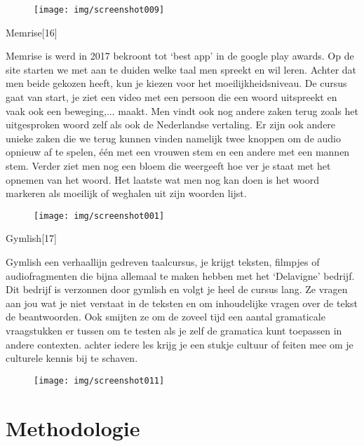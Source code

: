 \documentclass{hogent-article}
\begin{document}
\begin{figure}
    \centering
    \texttt{[image: img/screenshot009]}
    \caption{}
    \label{fig:screenshot009}
\end{figure}

Memrise[16]

Memrise is werd in 2017 bekroont tot ‘best app’ in de google play awards. Op de site starten we met aan te duiden welke taal men spreekt en wil leren. Achter dat men beide gekozen heeft, kun je kiezen voor het moeilijkheidsniveau. De cursus gaat van start, je ziet een video met een persoon die een woord uitspreekt en vaak ook een beweging,... maakt. Men vindt ook nog andere zaken terug zoals het uitgesproken woord zelf als ook de Nederlandse vertaling. Er zijn ook andere unieke zaken die we terug kunnen vinden namelijk twee knoppen om de audio opnieuw af te spelen, één met een vrouwen stem en een andere met een mannen stem. Verder ziet men nog een bloem die weergeeft hoe ver je staat met het opnemen van het woord. Het laatste wat men nog kan doen is het woord markeren als moeilijk of weghalen uit zijn woorden lijst.  

\begin{figure}
    \centering
    \texttt{[image: img/screenshot001]}
    \caption{}
    \label{fig:screenshot001}
\end{figure}

Gymlish[17]

Gymlish een verhaallijn gedreven taalcursus, je krijgt teksten, filmpjes of audiofragmenten die bijna allemaal te maken hebben met het ‘Delavigne’ bedrijf. Dit bedrijf is verzonnen door gymlish en volgt je heel de cursus lang. Ze vragen aan jou wat je niet verstaat in de teksten en om inhoudelijke vragen over de tekst de beantwoorden. Ook smijten ze om de zoveel tijd een aantal gramaticale vraagstukken er tussen om te testen als je zelf de gramatica kunt toepassen in andere contexten. achter iedere les krijg je een stukje cultuur of feiten mee om je culturele kennis bij te schaven.

\begin{figure}
    \centering
    \texttt{[image: img/screenshot011]}
    \caption{}
    \label{fig:screenshot011}
\end{figure}


\section{Methodologie}
\end{document}
